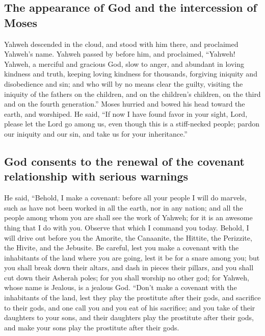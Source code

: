 \hypertarget{the-appearance-of-god-and-the-intercession-of-moses}{%
\subsection{The appearance of God and the intercession of
Moses}\label{the-appearance-of-god-and-the-intercession-of-moses}}

 Yahweh descended in the cloud, and stood with him there,
and proclaimed Yahweh's name.  Yahweh passed by before
him, and proclaimed, ``Yahweh! Yahweh, a merciful and gracious God, slow
to anger, and abundant in loving kindness and truth, 
keeping loving kindness for thousands, forgiving iniquity and
disobedience and sin; and who will by no means clear the guilty,
visiting the iniquity of the fathers on the children, and on the
children's children, on the third and on the fourth generation.''
 Moses hurried and bowed his head toward the earth, and
worshiped.  He said, ``If now I have found favor in your
sight, Lord, please let the Lord go among us, even though this is a
stiff-necked people; pardon our iniquity and our sin, and take us for
your inheritance.''

\hypertarget{god-consents-to-the-renewal-of-the-covenant-relationship-with-serious-warnings}{%
\subsection{God consents to the renewal of the covenant relationship
with serious
warnings}\label{god-consents-to-the-renewal-of-the-covenant-relationship-with-serious-warnings}}

 He said, ``Behold, I make a covenant: before all your
people I will do marvels, such as have not been worked in all the earth,
nor in any nation; and all the people among whom you are shall see the
work of Yahweh; for it is an awesome thing that I do with you.
 Observe that which I command you today. Behold, I will
drive out before you the Amorite, the Canaanite, the Hittite, the
Perizzite, the Hivite, and the Jebusite.  Be careful,
lest you make a covenant with the inhabitants of the land where you are
going, lest it be for a snare among you;  but you shall
break down their altars, and dash in pieces their pillars, and you shall
cut down their Asherah poles;  for you shall worship no
other god; for Yahweh, whose name is Jealous, is a jealous God.
 ``Don't make a covenant with the inhabitants of the
land, lest they play the prostitute after their gods, and sacrifice to
their gods, and one call you and you eat of his sacrifice;
 and you take of their daughters to your sons, and their
daughters play the prostitute after their gods, and make your sons play
the prostitute after their gods.

